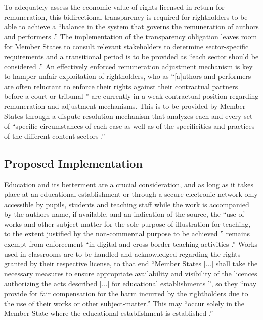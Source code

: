\documentclass[a4paper]{article}
\begin{document}
\noindent
To adequately assess the economic value of rights licensed in return for remuneration, this bidirectional transparency is required for rightholders to be able to achieve a ``balance in the system that governs the remuneration of authors and performers \cite{Copyright Reform}.'' The implementation of the transparency obligation leaves room for Member States to consult relevant stakeholders to determine sector-specific requirements and a transitional period is to be provided as ``each sector should be considered \cite{Copyright Reform}.'' An effectively enforced remuneration adjustment mechanism is key to hamper unfair exploitation of rightholders, who as ``[a]uthors and performers are often reluctant to enforce their rights against their contractual partners before a court or tribunal \cite{Copyright Reform}'' are currently in a weak contractual position regarding remuneration and adjustment mechanisms. This is to be provided by Member States through a dispute resolution mechanism that analyzes each and every set of ``specific circumstances of each case as well as of the specificities and practices of the different content sectors \cite{Copyright Reform}.'' 

\subsection{Proposed Implementation} 

Education and its betterment are a crucial consideration, and as long as it takes place at an educational establishment or through a secure electronic network only accessible by pupils, students and teaching staff while the work is accompanied by the authors name, if available, and an indication of the source, the ``use of works and other subject-matter for the sole purpose of illustration for teaching, to the extent justified by the non-commercial purpose to be achieved \cite{Copyright Reform}'' remains exempt from enforcement ``in digital and cross-border teaching activities \cite{Copyright Reform}.'' Works used in classrooms are to be handled and acknowledged regarding the rights granted by their respective license, to that end ``Member States [...] shall take the necessary measures to ensure appropriate availability and visibility of the licences authorizing the acts described [...] for educational establishments \cite{Copyright Reform}'', so they ``may provide for fair compensation for the harm incurred by the rightholders due to the use of their works or other subject-matter.'' This may ``occur solely in the Member State where the educational establishment is established \cite{Copyright Reform}.'' \\
\end{document}
